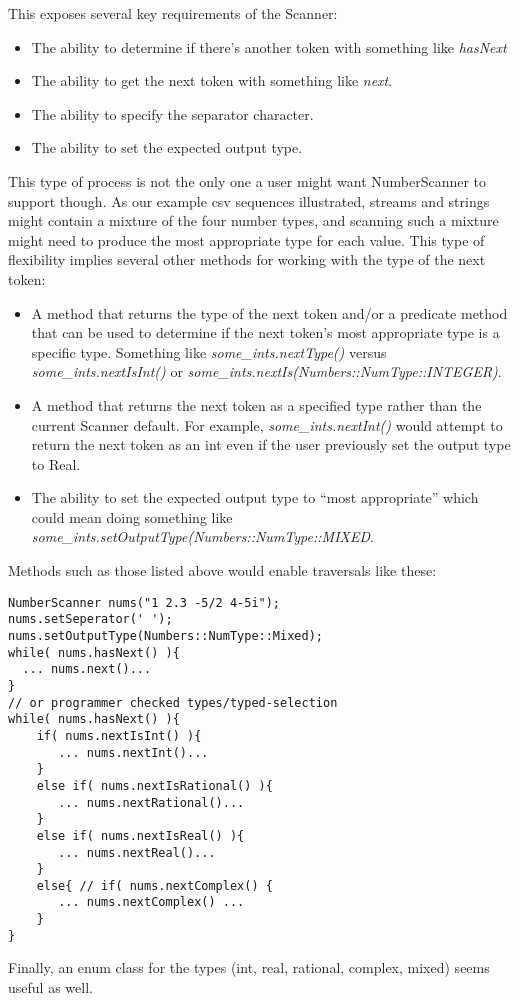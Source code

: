 \documentclass[10pt]{article}
\begin{document}
This exposes several key requirements of the Scanner:
\begin{itemize}
\item The ability to determine if there's another token with something like \textit{hasNext}
\item The ability to get the next token with something like \textit{next}. 
\item The ability to specify the separator character.
\item The ability to set the expected output type.
\end{itemize}

This type of process is not the only one a user might want NumberScanner to support though.  As our example csv sequences illustrated, streams and strings might contain a mixture of the four number types, and scanning such a mixture might need to produce the most appropriate type for each value. This type of flexibility implies several other methods for working with the type of the next token:
\begin{itemize}
\item A method that returns the type of the next token and/or a predicate method that can be used to determine if the next token's most appropriate type is a specific type. Something like \textit{some\_ints.nextType()} versus \textit{some\_ints.nextIsInt()} or \textit{some\_ints.nextIs(Numbers::NumType::INTEGER)}.
\item A method that returns the next token as a specified type rather than the current Scanner default. For example, \textit{some\_ints.nextInt()} would attempt to return the next token as an int even if the user previously set the output type to Real. 
\item The ability to set the expected output type to ``most appropriate'' which could mean doing something like \textit{some\_ints.setOutputType(Numbers::NumType::MIXED}.
\end{itemize}
Methods such as those listed above would enable traversals like these:
\begin{verbatim}
NumberScanner nums("1 2.3 -5/2 4-5i");
nums.setSeperator(' ');
nums.setOutputType(Numbers::NumType::Mixed);
while( nums.hasNext() ){
  ... nums.next()...
}
// or programmer checked types/typed-selection
while( nums.hasNext() ){
	if( nums.nextIsInt() ){
	   ... nums.nextInt()...
	}
	else if( nums.nextIsRational() ){
	   ... nums.nextRational()...
	}
	else if( nums.nextIsReal() ){
	   ... nums.nextReal()...
	}
	else{ // if( nums.nextComplex() {
       ... nums.nextComplex() ...
	}
}	
\end{verbatim}
Finally, an enum class for the types (int, real, rational, complex, mixed) seems useful as well.
\end{document}
